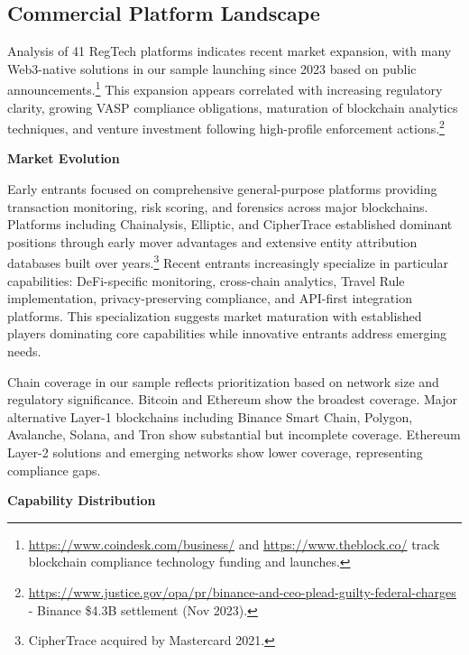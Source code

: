 \subsection{Commercial Platform Landscape}

Analysis of 41 RegTech platforms indicates recent market expansion, with many Web3-native solutions in our sample launching since 2023 based on public announcements.\footnote{\url{https://www.coindesk.com/business/} and \url{https://www.theblock.co/} track blockchain compliance technology funding and launches.} This expansion appears correlated with increasing regulatory clarity, growing VASP compliance obligations, maturation of blockchain analytics techniques, and venture investment following high-profile enforcement actions.\footnote{\url{https://www.justice.gov/opa/pr/binance-and-ceo-plead-guilty-federal-charges} - Binance \$4.3B settlement (Nov 2023).}

\noindent\textbf{Market Evolution}

Early entrants focused on comprehensive general-purpose platforms providing transaction monitoring, risk scoring, and forensics across major blockchains. Platforms including Chainalysis, Elliptic, and CipherTrace established dominant positions through early mover advantages and extensive entity attribution databases built over years.\footnote{CipherTrace acquired by Mastercard 2021.} Recent entrants increasingly specialize in particular capabilities: DeFi-specific monitoring, cross-chain analytics, Travel Rule implementation, privacy-preserving compliance, and API-first integration platforms. This specialization suggests market maturation with established players dominating core capabilities while innovative entrants address emerging needs.

Chain coverage in our sample reflects prioritization based on network size and regulatory significance. Bitcoin and Ethereum show the broadest coverage. Major alternative Layer-1 blockchains including Binance Smart Chain, Polygon, Avalanche, Solana, and Tron show substantial but incomplete coverage. Ethereum Layer-2 solutions and emerging networks show lower coverage, representing compliance gaps.

\noindent\textbf{Capability Distribution}

